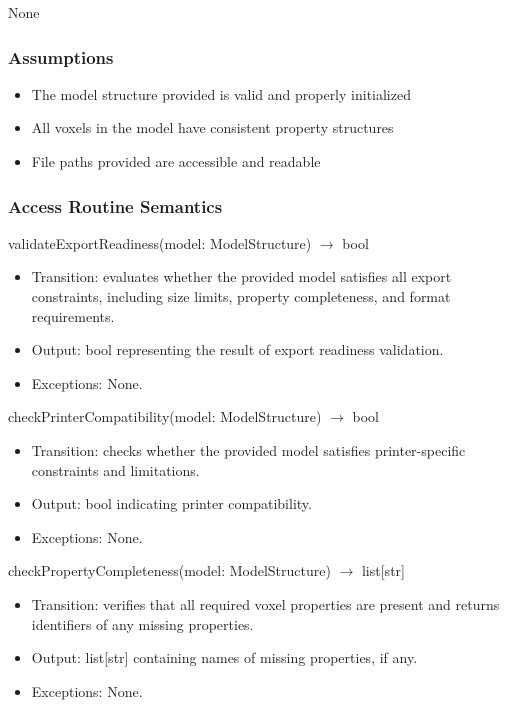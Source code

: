 \documentclass[12pt, titlepage]{article}
\begin{document}
None

\subsubsection{Assumptions}

\begin{itemize}
\item The model structure provided is valid and properly initialized
\item All voxels in the model have consistent property structures
\item File paths provided are accessible and readable
\end{itemize}

\subsubsection{Access Routine Semantics}

validateExportReadiness(model: ModelStructure) $\rightarrow$ bool
\begin{itemize}
  \item Transition: evaluates whether the provided model satisfies all export constraints, including size limits, property completeness, and format requirements.
  \item Output: bool representing the result of export readiness validation.
  \item Exceptions: None.
\end{itemize}

checkPrinterCompatibility(model: ModelStructure) $\rightarrow$ bool
\begin{itemize}
  \item Transition: checks whether the provided model satisfies printer-specific constraints and limitations.
  \item Output: bool indicating printer compatibility.
  \item Exceptions: None.
\end{itemize}

checkPropertyCompleteness(model: ModelStructure) $\rightarrow$ list[str]
\begin{itemize}
  \item Transition: verifies that all required voxel properties are present and returns identifiers of any missing properties.
  \item Output: list[str] containing names of missing properties, if any.
  \item Exceptions: None.
\end{itemize}
\end{document}
